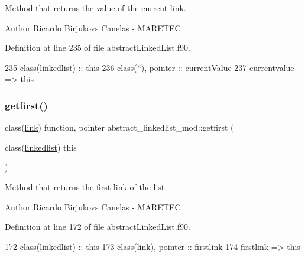 Method that returns the value of the current link. 

\begin{DoxyAuthor}{Author}
Ricardo Birjukovs Canelas -\/ M\+A\+R\+E\+T\+EC 
\end{DoxyAuthor}


Definition at line 235 of file abstract\+Linked\+List.\+f90.


\begin{DoxyCode}
235     \textcolor{keywordtype}{class}(linkedlist) :: this
236     \textcolor{keywordtype}{class}(*), \textcolor{keywordtype}{pointer} :: currentValue
237     currentvalue => this%
\end{DoxyCode}
\mbox{\label{namespaceabstract__linkedlist__mod_ad7b7ffee891627ae2b0548001650f72b}} 
\subsubsection{\texorpdfstring{getfirst()}{getfirst()}}
{\footnotesize\ttfamily class(\mbox{\hyperlink{structlink__mod_1_1link}{link}}) function, pointer abstract\+\_\+linkedlist\+\_\+mod\+::getfirst (\begin{DoxyParamCaption}\item[{class(\mbox{\hyperlink{structabstract__linkedlist__mod_1_1linkedlist}{linkedlist}})}]{this }\end{DoxyParamCaption})\hspace{0.3cm}{\ttfamily [private]}}



Method that returns the first link of the list. 

\begin{DoxyAuthor}{Author}
Ricardo Birjukovs Canelas -\/ M\+A\+R\+E\+T\+EC 
\end{DoxyAuthor}


Definition at line 172 of file abstract\+Linked\+List.\+f90.


\begin{DoxyCode}
172     \textcolor{keywordtype}{class}(linkedlist) :: this
173     \textcolor{keywordtype}{class}(link), \textcolor{keywordtype}{pointer} :: firstlink
174     firstlink => this%
\end{DoxyCode}
\mbox{\label{namespaceabstract__linkedlist__mod_a7c0a2e5b554e8859fc9b4d8fb52b124f}} 
